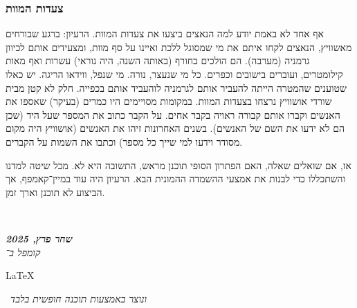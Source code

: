 \documentclass[]{article}
\newcommand\en[1] {\begin{otherlanguage}{english}#1\end{otherlanguage}}
\newcommand\ndoc  {\dotfill \\ \vfil {\begin{center}
			{\textbf{\textit{שחר פרץ, 2025}} \\
				\scriptsize \textit{קומפל ב־}\en{\LaTeX}\,\textit{ ונוצר באמצעות תוכנה חופשית בלבד}}
	\end{center}} \vfil	}
\theoremstyle{definition}
\begin{document}
	\subsubsection{צעדות המוות}
	אף אחד לא באמת יודע למה הנאצים ביצעו את צעדות המוות. הרעיון: ברגע שבורחים מאשוויץ, הנאצים לקחו איתם את מי שמסוגל ללכת ואיינו על סף מוות, ומצעידים אותם לכיוון גרמניה (מערבה). הם הולכים בחורף (באותה השנה, היה נוראי) עשרות ואף מאות קילומטרים, ועוברים בישובים וכפרים. כל מי שנעצר, נורה. מי שנפל, ווידאו הריגה. יש כאלו שטוענים שהמטרה הייתה להעביר אותם לגרמניה לוהעביד אותם בכפייה. חלק לא קטן מבית שורדי אושוויץ נרצחו בצעדות המוות. במקומות מסויימים היו כמרים (בעיקר) שאספו את האנשים וקברו אותם קבורה ראויה בקבר אחים. על הקבר כתוב את המספר שעל היד (שכן הם לא ידעו את השם של האנשים). בשנים האחרונות זיהו את האנשים (אושוויץ היה מקום מסודר וידעו למי שייך כל מספר) וכתבו את השמות על הקברים. 
	
	
	אז, אם שואלים שאלה, האם הפתרון הסופי תוכנן מראש, התשובה היא לא. מכל שיטה למדנו והשתכללו כדי לבנות את אמצעי ההשמדה ההמונית הבא. הרעיון היה עוד במיין־קאמפף, אך הביצוע לא תוכנן וארך זמן. 
	
	
	
	
	
	
	\ndoc
\end{document}
